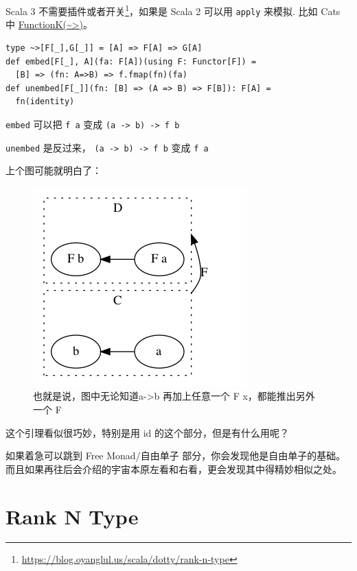 \documentclass[letterspacing]{tufte-book}
\begin{document}
Scala 3 不需要插件或者开关\footnote{\url{https://blog.oyanglul.us/scala/dotty/rank-n-type}}，如果是 Scala 2 可以用 \texttt{apply} 来模拟. 比如 Cats 中 \href{https://typelevel.org/cats/datatypes/functionk.html}{FunctionK(\textasciitilde{}>)}。
\lstset{language=scala,label= ,caption= ,captionpos=b,numbers=none}
\begin{lstlisting}
type ~>[F[_],G[_]] = [A] => F[A] => G[A]
def embed[F[_], A](fa: F[A])(using F: Functor[F]) =
  [B] => (fn: A=>B) => f.fmap(fn)(fa)
def unembed[F[_]](fn: [B] => (A => B) => F[B]): F[A] =
  fn(identity)
\end{lstlisting}

\texttt{embed} 可以把 \texttt{f a} 变成 \texttt{(a -> b) -> f b}

\texttt{unembed} 是反过来， \texttt{(a -> b) -> f b} 变成 \texttt{f a}

上个图可能就明白了：
\begin{figure}[htbp]
\centering
\includegraphics[width=.9\linewidth]{images/yoneda-lemma.png}
\caption{也就是说，图中无论知道a->b 再加上任意一个 F x，都能推出另外一个 F}
\end{figure}

这个引理看似很巧妙，特别是用 id 的这个部分，但是有什么用呢？

如果着急可以跳到 Free Monad/自由单子 部分，你会发现他是自由单子的基础。而且如果再往后会介绍的宇宙本原左看和右看，更会发现其中得精妙相似之处。

\section{Rank N Type}
\label{sec:orgbc21743}
\end{document}
